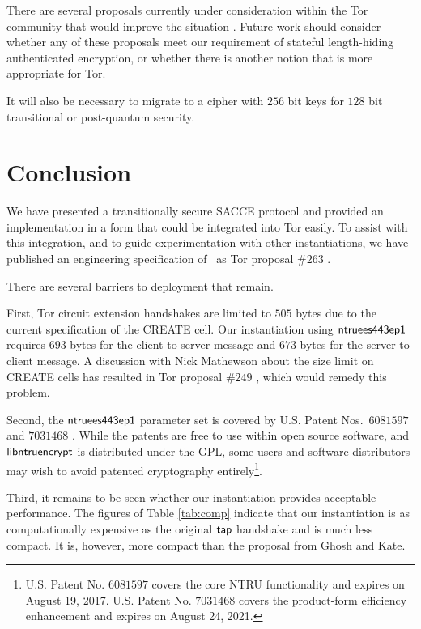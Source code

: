 \documentclass[USenglish,oneside,twocolumn]{article}
\theoremstyle{dgthm}
\theoremstyle{dgdef}
\newcommand{\hybrid}{{\sf {hybrid}}}
\begin{document}
      There are several proposals currently under consideration within the Tor
      community that would improve the situation
      \cite{TorPropRelay,TorPropAez}.  Future work should consider
      whether any of these proposals meet our requirement of stateful
      length-hiding authenticated encryption, or whether there is another
      notion that is more appropriate for Tor.

      It will also be necessary to migrate to a cipher with $256$ bit keys for
      $128$ bit transitional or post-quantum security.

\vspace{-2em}
\section{Conclusion}

  We have presented a transitionally secure SACCE protocol and provided an
  implementation in a form that could be integrated into Tor easily.
  To assist with this integration, and to guide experimentation with other
  instantiations, we have published an engineering specification of
  \hybrid~as Tor proposal $\#263$ \cite{TorPropHybrid}.

  There are several barriers to deployment that remain.

  First, Tor circuit extension handshakes are limited to $505$ bytes due to the
  current specification of the CREATE cell. Our instantiation using ${\sf
  ntruees443ep1}$ requires $693$ bytes for the client to server message and
  $673$ bytes for the server to client message.  A discussion with Nick
  Mathewson about the size limit on CREATE cells has resulted in Tor proposal
  $\#249$ \cite{TorPropCell}, which would remedy this problem.

  Second, the ${\sf ntruees443ep1}$ parameter set is covered by U.S. Patent
  Nos.\ $6081597$ and $7031468$ \cite{PatentNTRU,PatentProduct}. While the
  patents are free to use within open source software, and ${\sf
  libntruencrypt}$ is distributed under the GPL, some users and software
  distributors may wish to avoid patented cryptography entirely\footnote{U.S. Patent
  No. $6081597$ covers the core NTRU functionality and expires on August 19, 2017. U.S. Patent
  No. $7031468$ covers the product-form efficiency enhancement and expires on August 24, 2021.}.

  Third, it remains to be seen whether our instantiation provides acceptable
  performance. The figures of Table \ref{tab:comp} indicate that our
  instantiation is as computationally expensive as the original ${\sf tap}$
  handshake and is much less compact. It is, however, more compact than the
  proposal from Ghosh and Kate.
\end{document}
